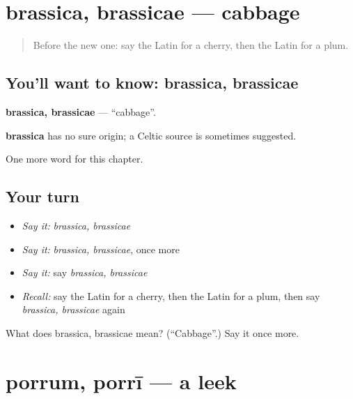 \section[brassica, brassicae]{brassica, brassicae — cabbage}

\label{lesson:LA-C279-brassica}



\begin{quote}
Before the new one: say the Latin for a cherry, then the Latin for a plum.
\end{quote}

\subsection*{You'll want to know: brassica, brassicae}
\textbf{brassica, brassicae} — \textquotedblleft{}cabbage\textquotedblright{}.

\begin{cousinweb}
\textbf{brassica} has no sure origin; a Celtic source is sometimes suggested.
\end{cousinweb}

\begin{grammarlens}[title={What you've built}]
One more word for this chapter.
\end{grammarlens}

\subsection*{Your turn}
\begin{itemize}
\raggedright
  \item \emph{Say it:} \emph{brassica, brassicae}
  \item \emph{Say it:} \emph{brassica, brassicae}, once more
  \item \emph{Say it:} say \emph{brassica, brassicae}
  \item \emph{Recall:} say the Latin for a cherry, then the Latin for a plum, then say \emph{brassica, brassicae} again
\end{itemize}

\begin{tcolorbox}[breakable,colback=teal!4,colframe=teal!35!black,title={Before you move on}]
What does brassica, brassicae mean? (\textquotedblleft{}Cabbage\textquotedblright{}.) Say it once more.
\end{tcolorbox}
\section[porrum, porrī]{porrum, porrī — a leek}

